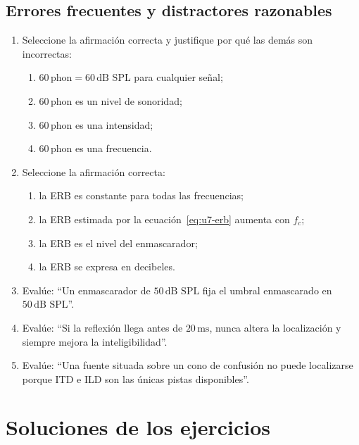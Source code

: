 \subsection*{Errores frecuentes y distractores razonables}

\begin{enumerate}[label=\textbf{D\arabic*.},leftmargin=*]
    \item Seleccione la afirmación correcta y justifique por qué las demás son
    incorrectas:
    \begin{enumerate}
        \item \(60\,\text{phon}=60\,\text{dB SPL}\) para cualquier señal;
        \item \(60\,\text{phon}\) es un nivel de sonoridad;
        \item \(60\,\text{phon}\) es una intensidad;
        \item \(60\,\text{phon}\) es una frecuencia.
    \end{enumerate}

    \item Seleccione la afirmación correcta:
    \begin{enumerate}
        \item la ERB es constante para todas las frecuencias;
        \item la ERB estimada por la ecuación~\eqref{eq:u7-erb} aumenta con
        \(f_c\);
        \item la ERB es el nivel del enmascarador;
        \item la ERB se expresa en decibeles.
    \end{enumerate}

    \item Evalúe: ``Un enmascarador de \(50\,\text{dB SPL}\) fija el umbral
    enmascarado en \(50\,\text{dB SPL}\)''.

    \item Evalúe: ``Si la reflexión llega antes de \(20\,\text{ms}\), nunca
    altera la localización y siempre mejora la inteligibilidad''.

    \item Evalúe: ``Una fuente situada sobre un cono de confusión no puede
    localizarse porque ITD e ILD son las únicas pistas disponibles''.
\end{enumerate}

\section{Soluciones de los ejercicios}
\label{sec:u7-soluciones}

